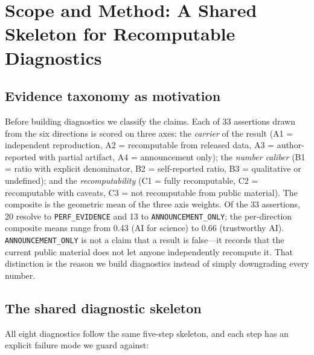 \section{Scope and Method: A Shared Skeleton for Recomputable Diagnostics}
\label{sec:scope}

\subsection{Evidence taxonomy as motivation}

Before building diagnostics we classify the claims. Each of 33 assertions drawn
from the six directions is scored on three axes: the \emph{carrier} of the result
(A1 = independent reproduction, A2 = recomputable from released data, A3 =
author-reported with partial artifact, A4 = announcement only); the \emph{number
caliber} (B1 = ratio with explicit denominator, B2 = self-reported ratio, B3 =
qualitative or undefined); and the \emph{recomputability} (C1 = fully
recomputable, C2 = recomputable with caveats, C3 = not recomputable from public
material). The composite is the geometric mean of the three axis weights. Of the
33 assertions, 20 resolve to \texttt{PERF\_EVIDENCE} and 13 to
\texttt{ANNOUNCEMENT\_ONLY}; the per-direction composite means range from 0.43
(AI for science) to 0.66 (trustworthy AI). \texttt{ANNOUNCEMENT\_ONLY} is not a
claim that a result is false---it records that the current public material does
not let anyone independently recompute it. That distinction is the reason we
build diagnostics instead of simply downgrading every number.

\subsection{The shared diagnostic skeleton}

All eight diagnostics follow the same five-step skeleton, and each step has an
explicit failure mode we guard against:

